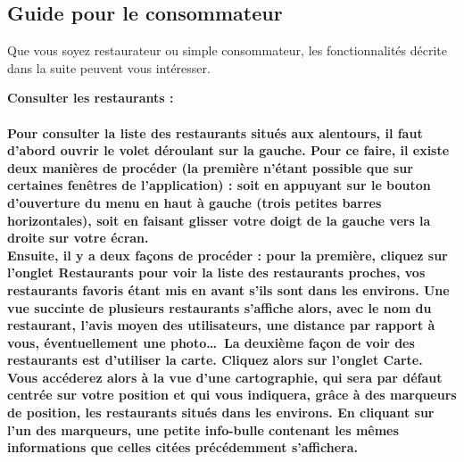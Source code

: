 \subsection{Guide pour le consommateur}

Que vous soyez restaurateur ou simple consommateur, les fonctionnalités décrite dans la suite peuvent vous intéresser. \\

\begin{description}
    \item \bf{Consulter les restaurants :} \\ \\
        Pour consulter la liste des restaurants situés aux alentours, il faut d'abord ouvrir le volet déroulant sur la gauche. Pour ce faire, il existe deux manières de procéder (la première n'étant possible que sur certaines fenêtres de l’application) : soit en appuyant sur le bouton d'ouverture du menu en haut à gauche (trois petites barres horizontales), soit en faisant glisser votre doigt de la gauche vers la droite sur votre écran. \\
        Ensuite, il y a deux façons de procéder : pour la première, cliquez sur l'onglet \og{}Restaurants\fg{} pour voir la liste des restaurants proches, vos restaurants favoris étant mis en avant s'ils sont dans les environs. Une vue succinte de plusieurs restaurants s'affiche alors, avec le nom du restaurant, l'avis moyen des utilisateurs, une distance par rapport à vous, éventuellement une photo\dots~La deuxième façon de voir des restaurants est d'utiliser la carte. Cliquez alors sur l’onglet \og{}Carte\fg{}. Vous accéderez alors à la vue d'une cartographie, qui sera par défaut centrée sur votre position et qui vous indiquera, grâce à des marqueurs de position, les restaurants situés dans les environs. En cliquant sur l'un des marqueurs, une petite info-bulle contenant les mêmes informations que celles citées précédemment s’affichera. \\


\end{description}
